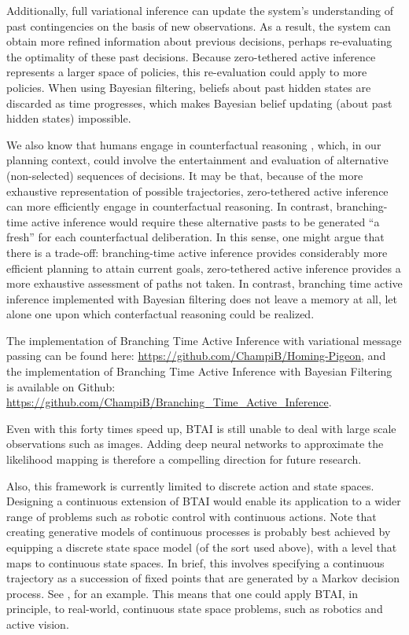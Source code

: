 \documentclass[twoside,11pt]{article}
\begin{document}
Additionally, full variational inference can update the system's understanding of past contingencies on the basis of new observations. As a result, the system can obtain more refined information about previous decisions, perhaps re-evaluating the optimality of these past decisions. Because zero-tethered active inference represents a larger space of policies, this re-evaluation could apply to more policies. When using Bayesian filtering, beliefs about past hidden states are discarded as time progresses, which makes Bayesian belief updating (about past hidden states) impossible.

We also know that humans engage in counterfactual reasoning \citep{rafetseder2013counterfactual}, which, in our planning context, could involve the entertainment and evaluation of alternative (non-selected) sequences of decisions. It may be that, because of the more exhaustive representation of possible trajectories, zero-tethered active inference can more efficiently engage in counterfactual reasoning. In contrast, branching-time active inference would require these alternative pasts to be generated ``a fresh'' for each counterfactual deliberation. In this sense, one might argue that there is a trade-off: branching-time active inference provides considerably more efficient planning to attain current goals, zero-tethered active inference provides a more exhaustive assessment of paths not taken. In contrast, branching time active inference implemented with Bayesian filtering does not leave a memory at all, let alone one upon which conterfactual reasoning could be realized.

The implementation of Branching Time Active Inference with variational message passing can be found here: \url{https://github.com/ChampiB/Homing-Pigeon}, and the implementation of Branching Time Active Inference with Bayesian Filtering is available on Github: \url{https://github.com/ChampiB/Branching\_Time\_Active\_Inference}.

Even with this forty times speed up, BTAI is still unable to deal with large scale observations such as images. Adding deep neural networks to approximate the likelihood mapping is therefore a compelling direction for future research.

Also, this framework is currently limited to discrete action and state spaces. Designing a continuous extension of BTAI would enable its application to a wider range of problems such as robotic control with continuous actions. Note that creating generative models of continuous processes is probably best achieved by equipping a discrete state space model (of the sort used above), with a level that maps to continuous state spaces. In brief, this involves specifying a continuous trajectory as a succession of fixed points that are generated by a Markov decision process. See \citet{believe}, for an example. This means that one could apply BTAI, in principle, to real-world, continuous state space problems, such as robotics and active vision.
\end{document}
